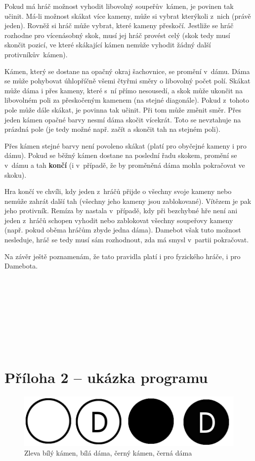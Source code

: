\documentclass[a4paper,12pt]{article}
\newcommand{\priloha}[1]{\section*{#1}\addcontentsline{toc}{section}{#1}}
\begin{document}
	Pokud má hráč možnost vyhodit libovolný soupeřův~kámen, je povinen tak učinit. Má-li možnost skákat více kameny,
	může si vybrat kterýkoli z~nich (právě jeden). Rovněž si hráč může vybrat, které kameny přeskočí. Jestliže se hráč
	rozhodne pro vícenásobný skok, musí jej hráč provést celý (skok tedy musí skončit pozicí, ve které skákající kámen
	nemůže vyhodit žádný další protivníkův~kámen).
	
	Kámen, který se dostane na opačný okraj šachovnice, se promění v~dámu. Dáma se může pohybovat úhlopříčně všemi čtyřmi
	směry o libovolný počet polí. Skákat může dáma i přes kameny, které s~ní přímo nesousedí, a skok může ukončit na
	libovolném poli za přeskočeným kamenem (na stejné diagonále). Pokud z~tohoto pole může dále skákat, je povinna tak
	učinit. Při tom může změnit směr. Přes jeden kámen opačné barvy nesmí dáma skočit vícekrát. Toto se nevztahuje na prázdná
	pole (je tedy možné např. začít a skončit tah na stejném poli).
	
	Přes kámen stejné barvy není povoleno skákat (platí pro obyčejné kameny i pro dámu). Pokud se běžný kámen dostane
	na poslední řadu skokem, promění se v~dámu a tah \textbf{končí} (i v~případě, že by proměněná dáma mohla pokračovat
	ve skoku).
	
	Hra končí ve chvíli, kdy jeden z~hráčů přijde o všechny svoje kameny nebo nemůže zahrát další tah (všechny jeho kameny
	jsou zablokované). Vítězem je pak jeho protivník. Remíza by nastala v~případě, kdy při bezchybné hře není ani jeden
	z~hráčů schopen vyhodit nebo zablokovat všechny soupeřovy kameny (např. pokud oběma hráčům zbyde jedna dáma).
	Damebot však tuto možnost nesleduje, hráč se tedy musí sám rozhodnout, zda má smysl v~partii pokračovat.
	
	Na závěr ještě poznamenám, že tato pravidla platí i pro fyzického hráče, i pro Damebota.
	\\
	\\
	\\
	\\
	\\
	\\
	\\
	\\
	\\
	
	\priloha{Příloha 2 -- ukázka programu}
	\begin{figure}[h]
		\centering
		\includegraphics{img/kameny}
		\caption{Zleva bílý kámen, bílá dáma, černý kámen, černá dáma}
	\end{figure}
\end{document}
